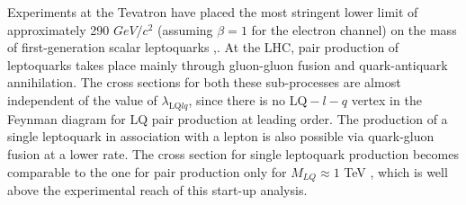 %

Experiments at the Tevatron have placed the most stringent lower 
limit of approximately 290 $GeV/c^2$ (assuming $\beta=1$ for the electron channel) 
on the mass of first-generation scalar leptoquarks \cite{d02008},\cite{cdf2005}.
At the LHC, pair production of leptoquarks takes place 
mainly through gluon-gluon fusion and 
quark-antiquark annihilation. 
The cross sections for both these sub-processes are almost 
independent of the value of 
$\lambda_{\mbox{LQ}lq}$, since there is 
no $\mbox{LQ}-l-q$ vertex in the Feynman diagram for LQ pair production 
at leading order. 
The production of a single leptoquark in association with a lepton 
is also possible via quark-gluon 
fusion at a lower rate. 
The cross section for single leptoquark production
becomes comparable to the one for pair production only 
for $M_{LQ}\approx 1$ TeV \cite{LQSingleAndPairProd}, 
which is well above the experimental reach of this start-up analysis.  

%

